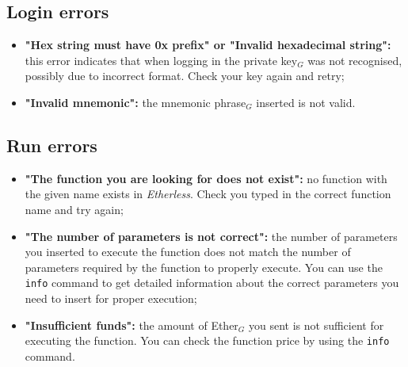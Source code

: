   \subsection{Login errors}
  \begin{itemize}
  	\item \textbf{"Hex string must have 0x prefix" or "Invalid hexadecimal string":} this error indicates that when logging in the private key$_{G}$ was not recognised, possibly due to incorrect format. Check your key again and retry;
  	\item \textbf{"Invalid mnemonic":} the mnemonic phrase$_{G}$ inserted is not valid.
  \end{itemize}
    
  \subsection{Run errors}
  \begin{itemize}
    \item \textbf{"The function you are looking for does not exist":} no function with the given name exists in \textit{Etherless}. Check you typed in the correct function name and try again;
     \item \textbf{"The number of parameters is not correct":} the number of parameters you inserted to execute the function does not match the number of parameters required by the function to properly execute. You can use the \texttt{info} command to get detailed information about the correct parameters you need to insert for proper execution;
      \item \textbf{"Insufficient funds":} the amount of Ether$_{G}$ you sent is not sufficient for executing the function. You can check the function price by using the \texttt{info} command.
  \end{itemize}
  
